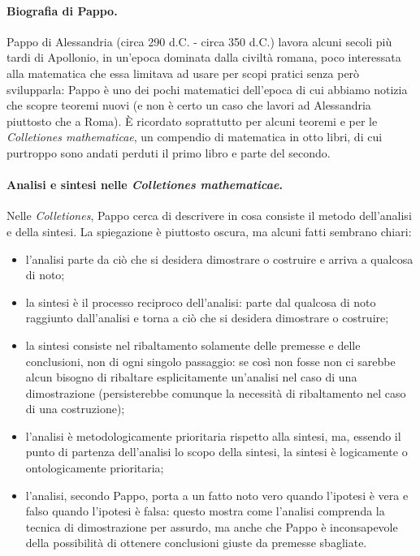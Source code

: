 \paragraph{Biografia di Pappo.} Pappo di Alessandria (circa 290 d.C. - circa 350 d.C.) lavora alcuni secoli pi\`u tardi di Apollonio, in un'epoca dominata dalla civilt\`a romana, poco interessata alla matematica che essa limitava ad usare per scopi pratici senza per\`o svilupparla: Pappo \`e uno dei pochi matematici dell'epoca di cui abbiamo notizia che scopre teoremi nuovi (e non \`e certo un caso che lavori ad Alessandria piuttosto che a Roma). \`E ricordato soprattutto per alcuni teoremi e per le \textit{Colletiones mathematicae}, un compendio di matematica in otto libri, di cui purtroppo sono andati perduti il primo libro e parte del secondo.
\paragraph{Analisi e sintesi nelle \textit{Colletiones mathematicae}.} Nelle \textit{Colletiones}, Pappo cerca di descrivere in cosa consiste il metodo dell'analisi e della sintesi. La spiegazione \`e piuttosto oscura, ma alcuni fatti sembrano chiari:
\begin{itemize}
	\item l'analisi parte da ci\`o che si desidera dimostrare o costruire e arriva a qualcosa di noto;
	\item la sintesi \`e il processo reciproco dell'analisi: parte dal qualcosa di noto raggiunto dall'analisi e torna a ci\`o che si desidera dimostrare o costruire;
	\item la sintesi consiste nel ribaltamento solamente delle premesse e delle conclusioni, non di ogni singolo passaggio: se cos\`i non fosse non ci sarebbe alcun bisogno di ribaltare esplicitamente un'analisi nel caso di una dimostrazione (persisterebbe comunque la necessit\`a di ribaltamento nel caso di una costruzione);
	\item l'analisi \`e metodologicamente prioritaria rispetto alla sintesi, ma, essendo il punto di partenza dell'analisi lo scopo della sintesi, la sintesi \`e logicamente o ontologicamente prioritaria;
	\item l'analisi, secondo Pappo, porta a un fatto noto vero quando l'ipotesi \`e vera e falso quando l'ipotesi \`e falsa: questo mostra come l'analisi comprenda la tecnica di dimostrazione per assurdo, ma anche che Pappo \`e inconsapevole della possibilit\`a di ottenere conclusioni giuste da premesse sbagliate.
\end{itemize}
